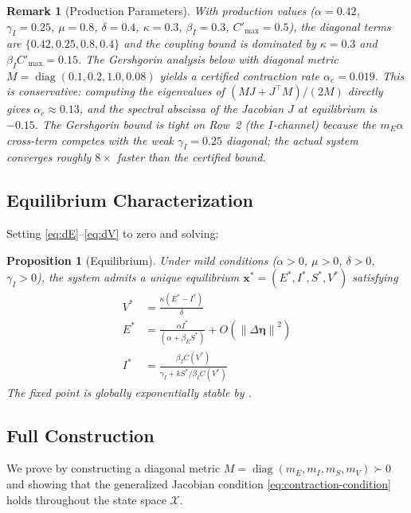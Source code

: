 \documentclass[11pt,twocolumn]{article}
\newtheorem{proposition}[theorem]{Proposition}
\newtheorem{remark}[theorem]{Remark}
\newcommand{\norm}[1]{\left\lVert #1 \right\rVert}
\newcommand{\eisv}{\ensuremath{\mathbf{x}}}
\newcommand{\deta}{\ensuremath{\Delta\bm{\eta}}}
\begin{document}
\begin{remark}[Production Parameters]
\label{rem:production-params}
With production values ($\alpha = 0.42$, $\gamma_I = 0.25$,
$\mu = 0.8$, $\delta = 0.4$, $\kappa = 0.3$, $\beta_I = 0.3$,
$C'_{\max} = 0.5$), the diagonal terms are
$\{0.42, 0.25, 0.8, 0.4\}$ and the coupling bound is dominated by
$\kappa = 0.3$ and $\beta_I C'_{\max} = 0.15$. The Gershgorin
analysis below with diagonal metric
$M = \operatorname{diag}(0.1, 0.2, 1.0, 0.08)$ yields a certified
contraction rate $\alpha_c = 0.019$. This is conservative:
computing the eigenvalues of $(MJ + J^\top\! M)/(2M)$ directly
gives $\alpha_c \approx 0.13$, and the spectral abscissa of the
Jacobian $J$ at equilibrium is $-0.15$. The Gershgorin bound is
tight on Row~2 (the $I$-channel) because the $m_E \alpha$
cross-term competes with the weak $\gamma_I = 0.25$ diagonal; the
actual system converges roughly $8\times$ faster than the
certified bound.
\end{remark}

\subsection*{Equilibrium Characterization}

Setting \eqref{eq:dE}--\eqref{eq:dV} to zero and solving:

\begin{proposition}[Equilibrium]
\label{prop:equilibrium}
Under mild conditions ($\alpha > 0$, $\mu > 0$, $\delta > 0$,
$\gamma_I > 0$), the system admits a unique equilibrium
$\eisv^* = (E^*, I^*, S^*, V^*)$ satisfying
\begin{align}
  V^* &= \frac{\kappa(E^* - I^*)}{\delta} \label{eq:Vstar} \\
  E^* &= \frac{\alpha I^*}{(\alpha + \beta_E S^*)} + O(\norm{\deta}^2)
    \label{eq:Estar} \\
  I^* &= \frac{\beta_I C(V^*)}{\gamma_I + kS^*/\beta_I C(V^*)}
    \label{eq:Istar}
\end{align}
The fixed point is globally exponentially stable by
.
\end{proposition}

\subsection*{Full Construction}

We prove  by constructing a diagonal metric
$M = \operatorname{diag}(m_E, m_I, m_S, m_V) \succ 0$ and showing
that the generalized Jacobian condition \eqref{eq:contraction-condition}
holds throughout the state space $\mathcal{X}$.
\end{document}
